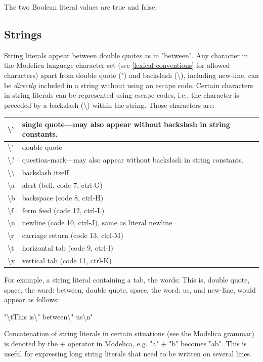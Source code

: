 \documentclass[10pt,a4paper]{report}
\def\doublelabel#1{\label{#1}\hypertarget{#1}{}}
\begin{document}
The two Boolean literal values are true and false.

\subsection{Strings}\doublelabel{strings}

String literals appear between double quotes as in "between". Any
character in the Modelica language character set (see \ref{lexical-conventions} for
allowed characters) apart from double quote (") and backslash
(\textbackslash{}), including new-line, can be \emph{directly} included
in a string without using an escape code. Certain characters in string
literals can be represented using escape codes, i.e., the character is
preceded by a backslash (\textbackslash{}) within the string. Those
characters are:

\begin{longtable}[c]{@{}ll@{}}
\textbackslash{}' & single quote---may also appear without backslash in
string constants.\\ \hline
\textbackslash{}" & double quote\\ \hline
\textbackslash{}? & question-mark---may also appear without backslash in
string constants.\\ \hline
\textbackslash{}\textbackslash{} & backslash itself\\ \hline
\textbackslash{}a & alert (bell, code 7, ctrl-G)\\ \hline
\textbackslash{}b & backspace (code 8, ctrl-H)\\ \hline
\textbackslash{}f & form feed (code 12, ctrl-L)\\ \hline
\textbackslash{}n & newline (code 10, ctrl-J), same as literal
newline\\ \hline
\textbackslash{}r & carriage return (code 13, ctrl-M)\\ \hline
\textbackslash{}t & horizontal tab (code 9, ctrl-I)\\ \hline
\textbackslash{}v & vertical tab (code 11, ctrl-K)\\ \hline
\end{longtable}

For example, a string literal containing a tab, the words: This is,
double quote, space, the word: between, double quote, space, the word:
us, and new-line, would appear as follows:

"\textbackslash{}tThis is\textbackslash{}" between\textbackslash{}"
us\textbackslash{}n"

Concatenation of string literals in certain situations (see the Modelica
grammar) is denoted by the + operator in Modelica, e.g. "a" + "b"
becomes "ab". This is useful for expressing long string literals that
need to be written on several lines.
\end{document}
